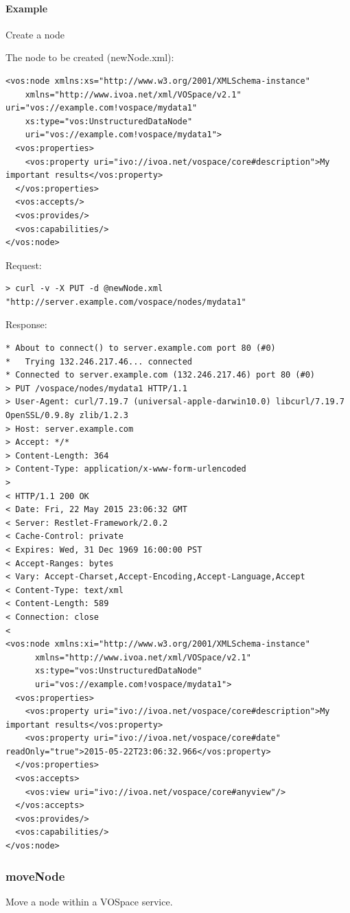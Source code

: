 \documentclass[11pt,a4paper]{ivoa}
\begin{document}
\paragraph{Example}
Create a node

\noindent
The node to be created (newNode.xml):
\begin{lstlisting}
<vos:node xmlns:xs="http://www.w3.org/2001/XMLSchema-instance"
    xmlns="http://www.ivoa.net/xml/VOSpace/v2.1" uri="vos://example.com!vospace/mydata1"
    xs:type="vos:UnstructuredDataNode"
    uri="vos://example.com!vospace/mydata1">
  <vos:properties>
    <vos:property uri="ivo://ivoa.net/vospace/core#description">My important results</vos:property>
  </vos:properties>
  <vos:accepts/>
  <vos:provides/>
  <vos:capabilities/>
</vos:node>
\end{lstlisting}
Request:
\begin{lstlisting}
> curl -v -X PUT -d @newNode.xml "http://server.example.com/vospace/nodes/mydata1"
\end{lstlisting}
Response:
\begin{lstlisting}
* About to connect() to server.example.com port 80 (#0)
*   Trying 132.246.217.46... connected
* Connected to server.example.com (132.246.217.46) port 80 (#0)
> PUT /vospace/nodes/mydata1 HTTP/1.1
> User-Agent: curl/7.19.7 (universal-apple-darwin10.0) libcurl/7.19.7 OpenSSL/0.9.8y zlib/1.2.3
> Host: server.example.com
> Accept: */*
> Content-Length: 364
> Content-Type: application/x-www-form-urlencoded
>
< HTTP/1.1 200 OK
< Date: Fri, 22 May 2015 23:06:32 GMT
< Server: Restlet-Framework/2.0.2
< Cache-Control: private
< Expires: Wed, 31 Dec 1969 16:00:00 PST
< Accept-Ranges: bytes
< Vary: Accept-Charset,Accept-Encoding,Accept-Language,Accept
< Content-Type: text/xml
< Content-Length: 589
< Connection: close
<
<vos:node xmlns:xi="http://www.w3.org/2001/XMLSchema-instance"
      xmlns="http://www.ivoa.net/xml/VOSpace/v2.1"
      xs:type="vos:UnstructuredDataNode" 
      uri="vos://example.com!vospace/mydata1">
  <vos:properties>
    <vos:property uri="ivo://ivoa.net/vospace/core#description">My important results</vos:property>
    <vos:property uri="ivo://ivoa.net/vospace/core#date" readOnly="true">2015-05-22T23:06:32.966</vos:property>
  </vos:properties>
  <vos:accepts>
    <vos:view uri="ivo://ivoa.net/vospace/core#anyview"/>
  </vos:accepts>
  <vos:provides/>
  <vos:capabilities/>
</vos:node>
\end{lstlisting}

\subsubsection{moveNode}
\label{subsubsec:movenode}
Move a node within a VOSpace service.
\end{document}
